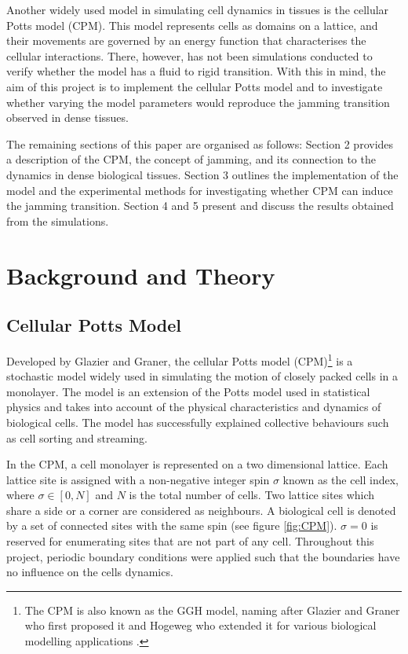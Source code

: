 \documentclass[a4paper,12pt]{article}
\begin{document}
Another widely used model in simulating cell dynamics in tissues is the cellular Potts model (CPM). This model represents cells as domains on a lattice, and their movements are governed by an energy function that characterises the cellular interactions. There, however, has not been simulations conducted to verify whether the model has a fluid to rigid transition. With this in mind, the aim of this project is to implement the cellular Potts model and to investigate whether varying the model parameters would reproduce the jamming transition observed in dense tissues. 

The remaining sections of this paper are organised as follows: Section 2 provides a description of the CPM, the concept of jamming, and its connection to the dynamics in dense biological tissues. Section 3 outlines the implementation of the model and the experimental methods for investigating whether CPM can induce the jamming transition. Section 4 and 5 present and discuss the results obtained from the simulations. 

\section{Background and Theory}
\subsection{Cellular Potts Model}
\label{sec:CPM}
Developed by Glazier and Graner\cite{graner1992}, the cellular Potts model (CPM)\footnote{The CPM is also known as the GGH model, naming after Glazier and Graner who first proposed it and Hogeweg who extended it for various biological modelling applications \cite{singlecell}.} is a stochastic model widely used in simulating the motion of closely packed cells in a monolayer. The model is an extension of the Potts model used in statistical physics and takes into account of the physical characteristics and dynamics of biological cells. The model has successfully explained collective behaviours such as cell sorting \cite{graner1992} and streaming\cite{szabo2010}.

In the CPM, a cell monolayer is represented on a two dimensional lattice. Each lattice site is assigned with a non-negative integer spin $\sigma$ known as the cell index, where $\sigma \in [0,N]$ and $N$ is the total number of cells. Two lattice sites which share a side or a corner are considered as neighbours. A biological cell is denoted by a set of connected sites with the same spin (see figure \ref{fig:CPM}). $\sigma = 0$ is reserved for enumerating sites that are not part of any cell. Throughout this project, periodic boundary conditions were applied such that the boundaries have no influence on the cells dynamics.
\end{document}
